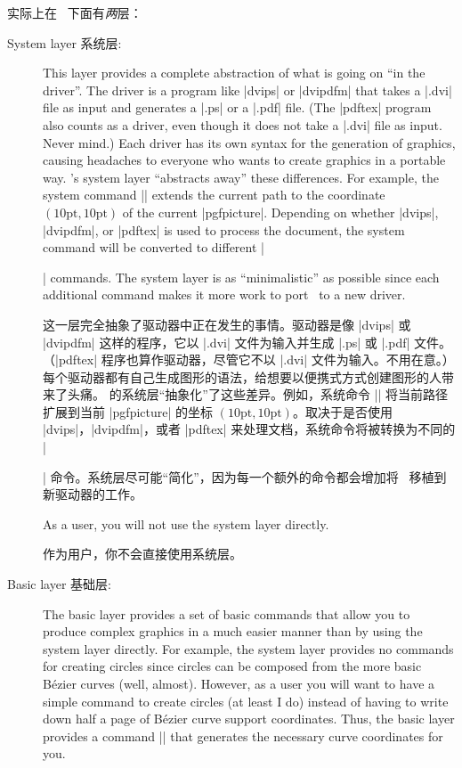 实际上在 \tikzname\ 下面有\emph{两}层：
%
\begin{description}
    \item[System layer 系统层:] This layer provides a complete abstraction of what
        is going on ``in the driver''. The driver is a program like |dvips|
        or |dvipdfm| that takes a |.dvi| file as input and generates a |.ps|
        or a |.pdf| file. (The |pdftex| program also counts as a driver, even
        though it does not take a |.dvi| file as input. Never mind.) Each
        driver has its own syntax for the generation of graphics, causing
        headaches to everyone who wants to create graphics in a portable way.
        \pgfname's system layer ``abstracts away'' these differences. For
        example, the system command |\pgfsys@lineto{10pt}{10pt}| extends the
        current path  to the coordinate $(10\mathrm{pt},10\mathrm{pt})$ of
        the current |{pgfpicture}|. Depending on whether |dvips|, |dvipdfm|,
        or |pdftex| is used to process the document, the system command will
        be converted to different |\special| commands. The system layer is as
        ``minimalistic'' as possible since each additional command makes it
        more work to port \pgfname\ to a new driver.

        这一层完全抽象了驱动器中正在发生的事情。驱动器是像 |dvips| 或 |dvipdfm| 这样的程序，它以 |.dvi| 文件为输入并生成 |.ps| 或 |.pdf| 文件。（|pdftex| 程序也算作驱动器，尽管它不以 |.dvi| 文件为输入。不用在意。）每个驱动器都有自己生成图形的语法，给想要以便携式方式创建图形的人带来了头痛。 \pgfname 的系统层“抽象化”了这些差异。例如，系统命令 |\pgfsys@lineto{10pt}{10pt}| 将当前路径扩展到当前 |{pgfpicture}| 的坐标 $(10\mathrm{pt},10\mathrm{pt})$。取决于是否使用 |dvips|，|dvipdfm|，或者 |pdftex| 来处理文档，系统命令将被转换为不同的 |\special| 命令。系统层尽可能“简化”，因为每一个额外的命令都会增加将 \pgfname\ 移植到新驱动器的工作。

        As a user, you will not use the system layer directly.

        作为用户，你不会直接使用系统层。
    \item[Basic layer 基础层:] The basic layer provides a set of basic commands that
        allow you to produce complex graphics in a much easier manner than by
        using the system layer directly. For example, the system layer provides
        no commands for creating circles since circles can be composed from the
        more basic Bézier curves (well, almost). However, as a user you will
        want to have a simple command to create circles (at least I do) instead
        of having to write down half a page of Bézier curve support
        coordinates. Thus, the basic layer provides a command |\pgfpathcircle|
        that generates the necessary curve coordinates for you.


\end{description}
